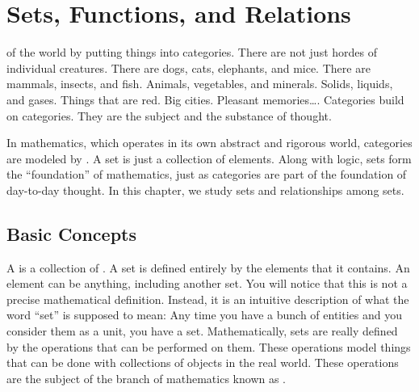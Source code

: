 \chapter{Sets, Functions, and Relations}\label{C-sets}

 of the world by putting
things into categories.  There are not just hordes of individual
creatures.  There are dogs, cats, elephants, and mice.  There are
mammals, insects, and fish.  Animals, vegetables, and minerals.
Solids, liquids, and gases.  Things that are red.  Big cities.
Pleasant memories\dots.  Categories build on categories.  They are the
subject and the substance of thought.

In mathematics, which operates in its own abstract and rigorous world,
categories are modeled by .  A set is just a collection of
elements.  Along with logic, sets form the ``foundation'' of
mathematics, just as categories are part of the foundation of
day-to-day thought.  In this chapter, we study sets and relationships
among sets.


\section{Basic Concepts}\label{S-sets-1}

A  is a collection of .
A set is defined entirely by the elements that it contains.
An element can be anything, including another set.  You will notice
that this is not a precise mathematical definition.  Instead, it is
an intuitive description of what the word ``set'' is supposed to mean:
Any time you have a bunch of entities and you consider them as a unit,
you have a set.  Mathematically, sets are really defined by the operations
that can be performed on them.  These operations model things that
can be done with collections of objects in the real world.  These operations
are the subject of the branch of mathematics known as .

